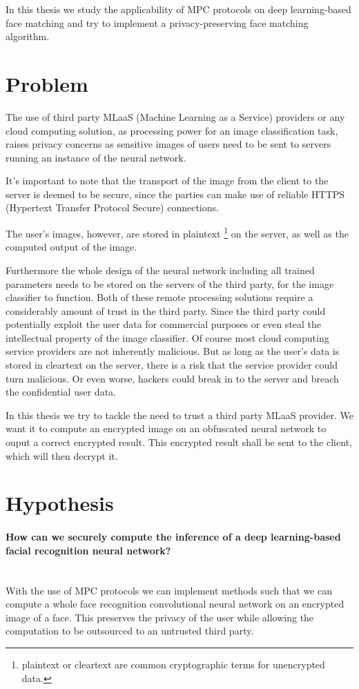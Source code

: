 In this thesis we study the applicability of MPC protocols on deep learning-based face matching and try to implement a privacy-preserving face matching algorithm.

\section{Problem}
The use of third party MLaaS (Machine Learning as a Service) providers or any cloud computing solution, as processing power for an image classification task, raises privacy concerns as sensitive images of users need to be sent to servers running an instance of the neural network.

It's important to note that the transport of the image from the client to the server is deemed to be secure, since the parties can make use of reliable HTTPS (Hypertext Transfer Protocol Secure) connections.

The user's images, however, are stored in plaintext \footnote{plaintext or cleartext are common cryptographic terms for unencrypted data.} on the server, as well as the computed output of the image.

Furthermore the whole design of the neural network including all trained parameters needs to be stored on the servers of the third party, for the image classifier to function. Both of these remote processing solutions require a considerably amount of trust in the third party. Since the third party could potentially exploit the user data for commercial purposes or even steal the intellectual property of the image classifier. Of course most cloud computing service providers are not inherently malicious. But as long as the user's data is stored in cleartext on the server, there is a risk that the service provider could turn malicious. Or even worse, hackers could break in to the server and breach the confidential user data.

In this thesis we try to tackle the need to trust a third party MLaaS provider. We want it to compute an encrypted image on an obfuscated neural network to ouput a correct encrypted result. This encrypted result shall be sent to the client, which will then decrypt it.

\section{Hypothesis}
\label{chapter:hypothesis}
\paragraph{How can we securely compute the inference of a deep learning-based facial recognition neural network?}\mbox{} \\
With the use of MPC protocols we can implement methods such that we can compute a whole face recognition convolutional neural network on an encrypted image of a face. This preserves the privacy of the user while allowing the computation to be outsourced to an untrusted third party.
